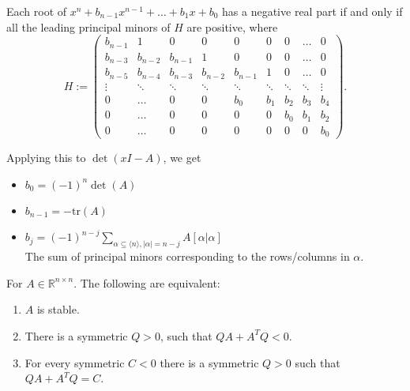 \documentclass{article}
\newcommand*{\R}{\mathbb{R}}
\newcommand*{\jbr}[1]{{\langle #1 \rangle}}
\newcommand*{\tr}{\text{tr}}
\begin{document}
\begin{thm}
    Each root of $x^n+b_{n-1}x^{n-1}+\dots +b_1x+b_0$ has a negative real part if and only if all the leading principal minors of $H$ are positive, where
    $$H := \begin{pmatrix}
    b_{n-1} & 1 & 0 & 0 & 0 & 0 & 0 & \dots & 0\\
    b_{n-3} & b_{n-2} & b_{n-1} & 1 & 0 & 0 & 0 & \dots & 0\\
    b_{n-5} & b_{n-4} & b_{n-3} & b_{n-2} & b_{n-1} & 1 & 0 & \dots & 0\\
    \vdots & \ddots & \ddots & \ddots & \ddots & \ddots & \ddots & \ddots & \vdots\\
    0 & \dots & 0 & 0 & b_0 & b_1 & b_2 & b_3 & b_4\\
    0 & \dots & 0 & 0 & 0 & 0 & b_0 & b_1 & b_2\\
    0 & \dots & 0 & 0 & 0 & 0 & 0 & 0 & b_0
    \end{pmatrix}.$$
\end{thm}
Applying this to $\det(xI-A)$, we get
\begin{itemize}
    \item $b_0 = (-1)^n\det(A)$

    \item $b_{n-1} = -\tr(A)$

    \item $b_j=(-1)^{n-j}\sum_{\alpha\subseteq \jbr{n}, |\alpha|=n-j} A[\alpha|\alpha]$\\
    The sum of principal minors corresponding to the rows/columns in $\alpha$.
\end{itemize}

\begin{thm}[Lyapunov]
    For $A\in \R^{n\times n}$. The following are equivalent:
    \begin{enumerate}
        \item $A$ is stable.

        \item There is a symmetric $Q>0$, such that $QA+A^TQ < 0$.

        \item For every symmetric $C <0$ there is a symmetric $Q>0$ such that $QA+A^TQ=C$.
    \end{enumerate}
\end{thm}
\end{document}
